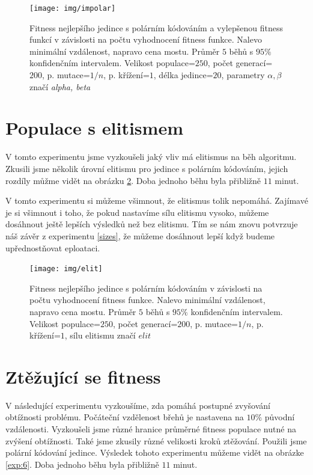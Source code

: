 \begin{figure}[p]\centering
\texttt{[image: img/impolar]}
\caption{Fitness nejlepšího jedince s polárním kódováním a vylepšenou fitness funkcí v závislosti na počtu vyhodnocení fitness funkce. Nalevo minimální vzdálenost, napravo cena mostu. Průměr $5$ běhů s $95\%$ konfidenčním intervalem. Velikost populace=$250$, počet generací=$200$, p. mutace=$1/n$, p. křížení=$1$, délka jedince=$20$, parametry $\alpha, \beta$ značí \emph{alpha, beta}}
\label{exp:4}
\end{figure}


\section{Populace s elitismem} 

V tomto experimentu jsme vyzkoušeli jaký vliv má elitismus na běh algoritmu. Zkusili jsme několik úrovní elitismu pro jedince s polárním kódováním, jejich rozdíly můžme vidět na obrázku \ref{exp:5}. Doba jednoho běhu byla přibližně $11$ minut.

V tomto experimentu si můžeme všimnout, že elitismus tolik nepomáhá. Zajímavé je si všimnout i toho, že pokud nastavíme sílu elitismu vysoko, můžeme dosáhnout ještě lepších výsledků než bez elitismu. Tím se nám znovu potvrzuje náš závěr z experimentu \ref{sizes}, že můžeme dosáhnout lepší když budeme upřednostňovat eploataci.

\begin{figure}[p]\centering
\texttt{[image: img/elit]}
\caption{Fitness nejlepšího jedince s polárním kódováním v závislosti na počtu vyhodnocení fitness funkce. Nalevo minimální vzdálenost, napravo cena mostu. Průměr $5$ běhů s $95\%$ konfidenčním intervalem. Velikost populace=$250$, počet generací=$200$, p. mutace=$1/n$, p. křížení=$1$, sílu elitismu značí $elit$}
\label{exp:5}
\end{figure}


\section{Ztěžující se fitness} \label{inc}

V následující experimentu vyzkoušíme, zda pomáhá postupné zvyšování obtížnosti problému. Počáteční vzdělenost břehů je nastavena na $10\%$ původní vzdálenosti. Vyzkoušeli jsme různé hranice průměrné fitness populace nutné na zvýšení obtížnosti. Také jsme zkusily různé velikosti kroků ztěžování. Použili jsme polární kódování jedince. Výsledek tohoto experimentu můžeme vidět na obrázke \ref{exp:6}. Doba jednoho běhu byla přibližně $11$ minut.

